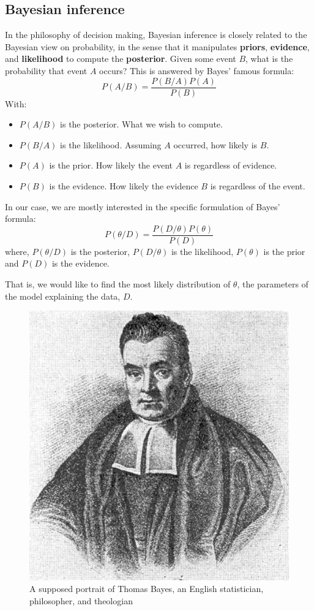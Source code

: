 \subsection{Bayesian inference}
In the philosophy of decision making, Bayesian inference is closely related to the Bayesian view on probability, in the sense that it manipulates \textbf{priors}, \textbf{evidence}, and \textbf{likelihood} to compute the \textbf{posterior}. Given some event $B$, what is the probability that event $A$ occurs? This is answered by Bayes' famous formula:
\begin{equation}P(A / B)=\frac{P(B / A) P(A)}{P(B)}\end{equation}
With:
\begin{itemize}
\item $P(A / B)$ is the posterior. What we wish to compute.
\item $P(B / A)$ is the likelihood. Assuming $A$ occurred, how likely is $B$.
\item $P(A)$ is the prior. How likely the event $A$ is regardless of evidence.
\item $P(B)$ is the evidence. How likely the evidence $B$ is regardless of the event.
\end{itemize}

In our case, we are mostly interested in the specific formulation of Bayes' formula:
\begin{equation}
P(\theta / D)=\frac{P(D / \theta) P(\theta)}{P(D)}
\end{equation}
where, $P(\theta / D)$ is the posterior, $P(D / \theta)$ is the likelihood, $P(\theta)$ is the prior and $P(D)$ is the evidence.

That is, we would like to find the most likely distribution of $\theta$, the parameters of the model explaining the data, $D$.

\begin{figure}[h]
    \centering
\includegraphics[width=.3\textwidth]{pic/p05c09-snip01}
    \caption{A supposed portrait of Thomas Bayes, an English statistician, philosopher, and theologian}
    \label{fig:p05c09-snip01}
\end{figure}

